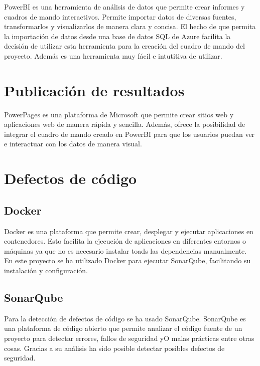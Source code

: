 PowerBI es una herramienta de análisis de datos que permite crear informes y cuadros de mando interactivos.
Permite importar datos de diversas fuentes, transformarlos y visualizarlos de manera clara y concisa.
El hecho de que permita la importación de datos desde una base de datos SQL de Azure facilita la decisión de utilizar esta herramienta para la creación del cuadro de mando del proyecto.
Además es una herramienta muy fácil e intutitiva de utilizar.

\section{Publicación de resultados}

PowerPages es una plataforma de Microsoft que permite crear sitios web y aplicaciones web de manera rápida y sencilla.
Además, ofrece la posibilidad de integrar el cuadro de mando creado en PowerBI para que los usuarios puedan ver e interactuar con los datos de manera visual.

\section{Defectos de código}

\subsection{Docker}

Docker es una plataforma que permite crear, desplegar y ejecutar aplicaciones en contenedores. 
Esto facilita la ejecución de aplicaciones en diferentes entornos o máquinas ya que no es necesario instalar toads las dependencias manualmente.
En este proyecto se ha utilizado Docker para ejecutar SonarQube, facilitando su instalación y configuración.

\subsection{SonarQube}

Para la detección de defectos de código se ha usado SonarQube. 
SonarQube es una plataforma de código abierto que permite analizar el código fuente
de un proyecto para detectar errores, fallos de seguridad yO malas prácticas entre otras cosas.
Gracias a su análisis ha sido posible detectar posibles defectos de seguridad.
